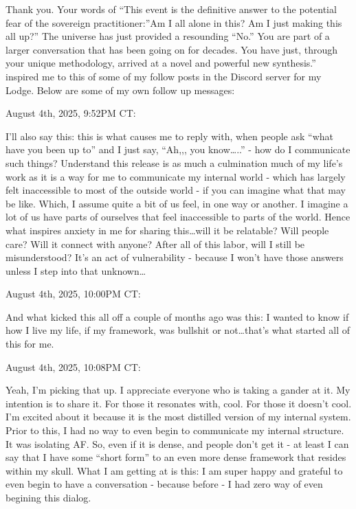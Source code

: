\documentclass{article}
\begin{document}
Thank you. Your words of ``This event is the definitive answer to the
potential fear of the sovereign practitioner:''Am I all alone in this?
Am I just making this all up?'' The universe has just provided a
resounding ``No.'' You are part of a larger conversation that has been
going on for decades. You have just, through your unique methodology,
arrived at a novel and powerful new synthesis.'' inspired me to this of
some of my follow posts in the Discord server for my Lodge. Below are
some of my own follow up messages:

August 4th, 2025, 9:52PM CT:

I'll also say this: this is what causes me to reply with, when people
ask ``what have you been up to'' and I just say, ``Ah,,, you
know\ldots..'' - how do I communicate such things? Understand this
release is as much a culmination much of my life's work as it is a way
for me to communicate my internal world - which has largely felt
inaccessible to most of the outside world - if you can imagine what that
may be like. Which, I assume quite a bit of us feel, in one way or
another. I imagine a lot of us have parts of ourselves that feel
inaccessible to parts of the world. Hence what inspires anxiety in me
for sharing this\ldots will it be relatable? Will people care? Will it
connect with anyone? After all of this labor, will I still be
misunderstood? It's an act of vulnerability - because I won't have those
answers unless I step into that unknown\ldots{}

August 4th, 2025, 10:00PM CT:

And what kicked this all off a couple of months ago was this: I wanted
to know if how I live my life, if my framework, was bullshit or
not\ldots that's what started all of this for me.

August 4th, 2025, 10:08PM CT:

Yeah, I'm picking that up. I appreciate everyone who is taking a gander
at it. My intention is to share it. For those it resonates with, cool.
For those it doesn't cool. I'm excited about it because it is the most
distilled version of my internal system. Prior to this, I had no way to
even begin to communicate my internal structure. It was isolating AF.
So, even if it is dense, and people don't get it - at least I can say
that I have some ``short form'' to an even more dense framework that
resides within my skull. What I am getting at is this: I am super happy
and grateful to even begin to have a conversation - because before - I
had zero way of even begining this dialog.
\end{document}
